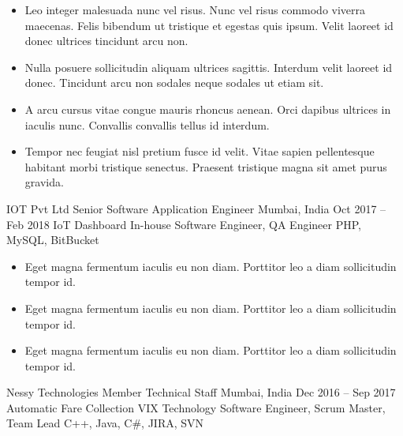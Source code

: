 \documentclass[10pt, a4paper]{cvhari}
\begin{document}
        \begin{itemize}
            \item Leo integer malesuada nunc vel risus. Nunc vel risus commodo viverra maecenas. Felis bibendum ut tristique et egestas quis ipsum. Velit laoreet id donec ultrices tincidunt arcu non.\smallskip
            \item Nulla posuere sollicitudin aliquam ultrices sagittis. Interdum velit laoreet id donec. Tincidunt arcu non sodales neque sodales ut etiam sit.\smallskip
            \item A arcu cursus vitae congue mauris rhoncus aenean. Orci dapibus ultrices in iaculis nunc. Convallis convallis tellus id interdum.\smallskip
            \item Tempor nec feugiat nisl pretium fusce id velit. Vitae sapien pellentesque habitant morbi tristique senectus. Praesent tristique magna sit amet purus gravida.\smallskip
        \end{itemize}


\smallskip
\divider
\smallskip


    \company
        {IOT Pvt Ltd}
        {Senior Software Application Engineer}
        {Mumbai, India}
        {Oct 2017 – Feb 2018}
        \project
        {IoT Dashboard}
        {In-house}
        {Software Engineer, QA Engineer}
        {PHP, MySQL, BitBucket}
        
        \begin{itemize}
            \item Eget magna fermentum iaculis eu non diam. Porttitor leo a diam sollicitudin tempor id. \smallskip
            \item Eget magna fermentum iaculis eu non diam. Porttitor leo a diam sollicitudin tempor id.\smallskip
            \item Eget magna fermentum iaculis eu non diam. Porttitor leo a diam sollicitudin tempor id.\smallskip
        \end{itemize}

\smallskip
\divider
\smallskip

    \company
        {Nessy Technologies}
        {Member Technical Staff}
        {Mumbai, India}
        {Dec 2016 – Sep 2017}
        \project
            {Automatic Fare Collection}
            {VIX Technology}
            {Software Engineer, Scrum Master, Team Lead}
            {C++, Java, C\#, JIRA, SVN}
        
\end{document}
